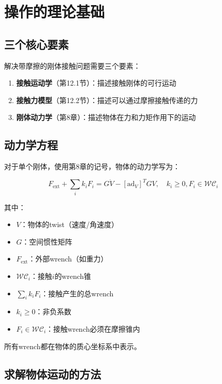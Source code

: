 \documentclass[12pt,a4paper]{article}
\begin{document}
\section{操作的理论基础}

\subsection{三个核心要素}

解决带摩擦的刚体接触问题需要三个要素：

\begin{enumerate}
    \item \textbf{接触运动学}（第12.1节）：描述接触刚体的可行运动
    \item \textbf{接触力模型}（第12.2节）：描述可以通过摩擦接触传递的力
    \item \textbf{刚体动力学}（第8章）：描述物体在力和力矩作用下的运动
\end{enumerate}

\subsection{动力学方程}

对于单个刚体，使用第8章的记号，物体的动力学写为：

\begin{equation}
F_{\text{ext}} + \sum_i k_i F_i = G \dot{V} - [\text{ad}_V]^T G V, \quad k_i \geq 0, F_i \in \mathcal{WC}_i
\label{eq:12.31}
\end{equation}

其中：
\begin{itemize}
    \item $V$：物体的twist（速度/角速度）
    \item $G$：空间惯性矩阵
    \item $F_{\text{ext}}$：外部wrench（如重力）
    \item $\mathcal{WC}_i$：接触$i$的wrench锥
    \item $\sum_i k_i F_i$：接触产生的总wrench
    \item $k_i \geq 0$：非负系数
    \item $F_i \in \mathcal{WC}_i$：接触wrench必须在摩擦锥内
\end{itemize}

所有wrench都在物体的质心坐标系中表示。

\subsection{求解物体运动的方法}
\end{document}
